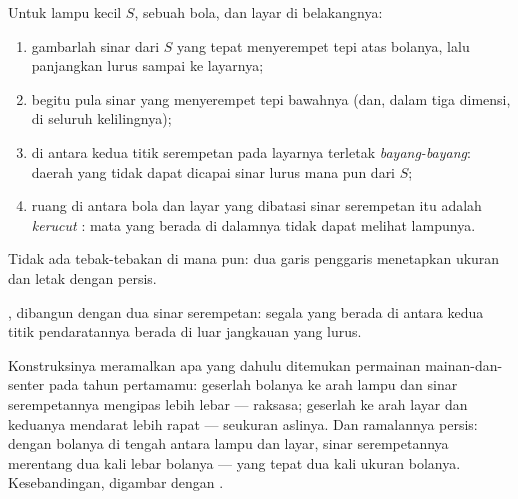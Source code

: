 \begin{method}\label{met:g6:light-propagation:shadow}
Untuk lampu kecil $S$, sebuah bola, dan layar di belakangnya:
\begin{enumerate}
  \item gambarlah sinar dari $S$ yang tepat menyerempet tepi atas
        bolanya, lalu panjangkan lurus sampai ke layarnya;
  \item begitu pula sinar yang menyerempet tepi bawahnya (dan, dalam
        tiga dimensi, di seluruh kelilingnya);
  \item di antara kedua titik serempetan pada layarnya terletak
        \emph{bayang-bayang}: daerah yang tidak
        dapat dicapai sinar lurus mana pun dari $S$;
  \item ruang di antara bola dan layar yang dibatasi sinar serempetan
        itu adalah \emph{kerucut }: mata yang berada di
        dalamnya tidak dapat melihat lampunya.
\end{enumerate}
Tidak ada tebak-tebakan di mana pun: dua garis penggaris menetapkan
ukuran dan letak  dengan persis.
\end{method}

\begin{omfigure}

{\small {}, dibangun dengan dua sinar serempetan: segala
yang berada di antara kedua titik pendaratannya berada di luar
jangkauan  yang lurus.}
\end{omfigure}

\begin{example}\label{ex:g6:light-propagation:sizes}
Konstruksinya meramalkan apa yang dahulu ditemukan permainan
mainan-dan-senter pada tahun pertamamu: geserlah bolanya ke arah lampu
dan sinar serempetannya mengipas lebih lebar --- 
raksasa; geserlah ke arah layar dan keduanya mendarat lebih rapat ---
 seukuran aslinya. Dan ramalannya persis: dengan bolanya
di tengah antara lampu dan layar, sinar serempetannya merentang dua
kali lebar bolanya ---  yang tepat dua kali ukuran
bolanya. Kesebandingan, digambar dengan .
\end{example}


